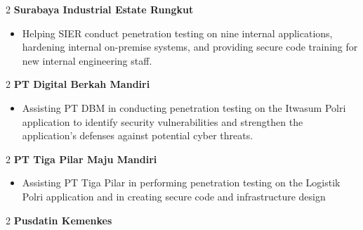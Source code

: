 \documentclass[10pt, letterpaper]{article}
\newenvironment{highlights}{
    \begin{itemize}[
        topsep=0.10 cm,
        parsep=0.10 cm,
        partopsep=0pt,
        itemsep=0pt,
        leftmargin=0 cm + 10pt
    ]
}{
    \end{itemize}
} %
\newenvironment{twocolentry}[2][]{
    \onecolentry
    \def\secondColumn{#2}
    \setcolumnwidth{\fill, 4.5 cm}
    \begin{paracol}{2}
}{
    \switchcolumn \raggedleft \secondColumn
    \end{paracol}
    \endonecolentry
} %
\begin{document}
		\begin{samepage}
				\begin{twocolentry}{}{\textbf{Surabaya Industrial Estate Rungkut}}
			\end{twocolentry}
			
			\begin{justify}
				\begin{highlights}
					\item Helping SIER conduct penetration testing on nine internal applications, hardening internal on-premise systems, and providing secure code training for new internal engineering staff.
					
				\end{highlights}
			\end{justify}
			
				\begin{twocolentry}{}{\textbf{PT Digital Berkah Mandiri}}
			\end{twocolentry}
			\begin{justify}
				\begin{highlights}
					\item Assisting PT DBM in conducting penetration testing on the Itwasum Polri application to identify security vulnerabilities and strengthen the application's defenses against potential cyber threats.
					
				\end{highlights}
			\end{justify}
			
			
			
			
			\begin{twocolentry}{}{\textbf{PT Tiga Pilar Maju Mandiri}}\end{twocolentry}
			\begin{justify}
				
				\begin{highlights}
					\item 
					Assisting PT Tiga Pilar in performing penetration testing on the Logistik Polri application and in creating secure code and infrastructure design
				\end{highlights}
				
			\end{justify}
			
			
			
			
			\begin{twocolentry}{}{\textbf{Pusdatin Kemenkes}}
			\end{twocolentry}
			

\end{samepage}
\end{document}
